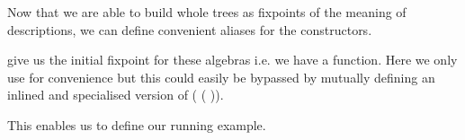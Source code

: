 Now that we are able to build whole trees as fixpoints of the
meaning of descriptions, we can define convenient aliases for
the  constructors.



 give us the initial fixpoint for these algebras i.e.
we have a  function. Here we only use \assertTotal
for convenience but this could easily be bypassed by mutually defining
an inlined and specialised version of
( ( )).


This enables us to define our running example.

